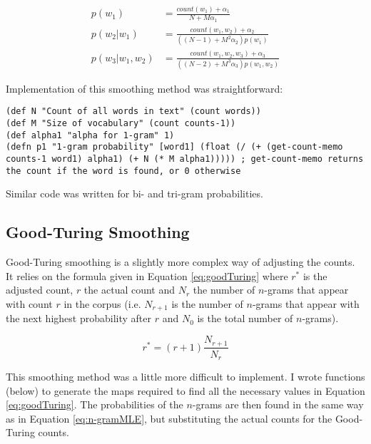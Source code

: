 \begin{subequations}
\begin{align}
p(w_{1})&=\frac{count(w_{1})+\alpha_{1}}{N+M\alpha_{1}} \label{eq:1-gramAdditiveSmoothing}
\\
p(w_{2}| w_{1})&=\frac{count(w_{1}, w_{2})+\alpha_{2}}{((N-1)+M^{2}\alpha_{2})p(w_{1})} \label{eq:2-gramAdditiveSmoothing}
\\
p(w_{3}| w_{1}, w_{2}) &= \frac{count(w_{1}, w_{2}, w_{3})+\alpha_{3}}{((N-2)+M^{3}\alpha_{3})p(w_{1}, w_{2})} \label{eq:3-gramAdditiveSmoothing}
\end{align}
\end{subequations}

Implementation of this smoothing method was straightforward:

\begin{lstlisting}
(def N "Count of all words in text" (count words))
(def M "Size of vocabulary" (count counts-1))
(def alpha1 "alpha for 1-gram" 1)
(defn p1 "1-gram probability" [word1] (float (/ (+ (get-count-memo counts-1 word1) alpha1) (+ N (* M alpha1))))) ; get-count-memo returns the count if the word is found, or 0 otherwise
\end{lstlisting}

\noindent Similar code was written for bi- and tri-gram probabilities.

\subsection{Good-Turing Smoothing}

Good-Turing smoothing is a slightly more complex way of adjusting the counts. It relies on the formula given in Equation \ref{eq:goodTuring} where $r^{*}$ is the adjusted count, $r$ the actual count and $N_{r}$ the number of $n$-grams that appear with count $r$ in the corpus (i.e. $N_{r+1}$ is the number of $n$-grams that appear with the next highest probability after $r$ and $N_{0}$ is the total number of $n$-grams).

\begin{equation}
r^{*}=(r+1)\frac{N_{r+1}}{N_{r}}
\label{eq:goodTuring}
\end{equation}

This smoothing method was a little more difficult to implement. I wrote functions (below) to generate the maps required to find all the necessary values in Equation \ref{eq:goodTuring}. The probabilities of the $n$-grams are then found in the same way as in Equation \ref{eq:n-gramMLE}, but substituting the actual counts for the Good-Turing counts.

